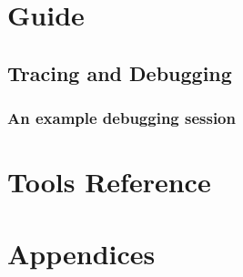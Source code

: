 \mainmatter

\part{Guide}





\chapter{Tracing and Debugging}
\section{An example debugging session}

\part{Tools Reference}






\part{Appendices}


